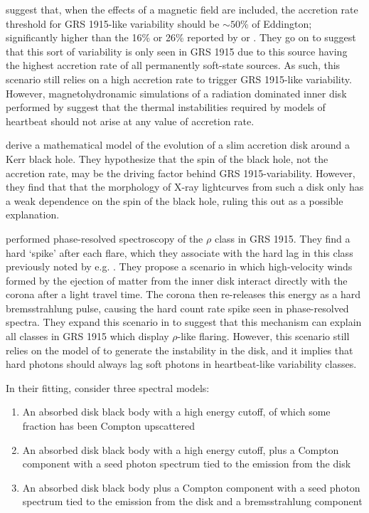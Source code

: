 \par \citealp{Zheng_Model} suggest that, when the effects of a magnetic field are included, the accretion rate threshold for GRS 1915-like variability should be $\sim50$\% of Eddington; significantly higher than the 16\% or 26\% reported by \citealp{Janiuk_RadInstab} or \citealp{Nayakshin_GRSModel}.  They go on to suggest that this sort of variability is only seen in GRS 1915 due to this source having the highest accretion rate of all permanently soft-state sources.  As such, this scenario still relies on a high accretion rate to trigger GRS 1915-like variability.  However, magnetohydronamic simulations of a radiation dominated inner disk performed by \citealp{Hirose_Stable} suggest that the thermal instabilities required by models of heartbeat should not arise at any value of accretion rate.
\par \citealp{Xue_Spin} derive a mathematical model of the evolution of a slim accretion disk around a Kerr black hole.  They hypothesize that the spin of the black hole, not the accretion rate, may be the driving factor behind GRS 1915-variability.  However, they find that that the morphology of X-ray lightcurves from such a disk only has a weak dependence on the spin of the black hole, ruling this out as a possible explanation.
\par \citealp{Neilsen_GRSModel} performed phase-resolved spectroscopy of the $\rho$ class in GRS 1915.  They find a hard `spike' after each flare, which they associate with the hard lag in this class previously noted by e.g. \citealp{Janiuk_Lag}.  They propose a scenario in which high-velocity winds formed by the ejection of matter from the inner disk interact directly with the corona after a light travel time.  The corona then re-releases this energy as a hard bremsstrahlung pulse, causing the hard count rate spike seen in phase-resolved spectra.  They expand this scenario in \citealp{Neilsen_Rho} to suggest that this mechanism can explain all classes in GRS 1915 which display $\rho$-like flaring.  However, this scenario still relies on the model of \citealp{Nayakshin_GRSModel} to generate the instability in the disk, and it implies that hard photons should always lag soft photons in heartbeat-like variability classes.  
\par In their fitting, \citealp{Neilsen_GRSModel} consider three spectral models:
\begin{enumerate}
\item An absorbed disk black body with a high energy cutoff, of which some fraction has been Compton upscattered
\item An absorbed disk black body with a high energy cutoff, plus a Compton component with a seed photon spectrum tied to the emission from the disk
\item An absorbed disk black body plus a Compton component with a seed photon spectrum tied to the emission from the disk and a bremsstrahlung component
\end{enumerate}
